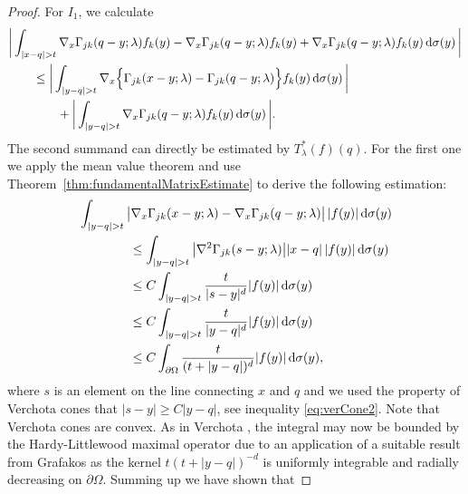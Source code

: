 \begin{proof}
   For $I_1$, we calculate
   \begin{align*}
     &\bigg| \int_{| x - q | > t} \nabla_x \Gamma_{j k} (q - y; \lambda) f_k(y) - \nabla_x \Gamma_{jk}(q - y; \lambda) f_k(y) + \nabla_x \Gamma_{jk}(q - y; \lambda) f_k(y) \, {\operatorname{d}\!{\sigma}}(y) \, \bigg| \\
     &\qquad\leq \bigg| \int_{|y - q| > t} \nabla_x \Big\{ \Gamma_{jk}(x - y; \lambda) -  \Gamma_{jk}(q - y; \lambda)\Big\} f_k(y) \, {\operatorname{d}\!{\sigma}}(y) \, \bigg| \\
     &\qquad\qquad+ \bigg| \int_{|y - q| > t} \nabla_x\Gamma_{jk}(q - y; \lambda) f_k(y) \, {\operatorname{d}\!{\sigma}}(y) \, \bigg|.
   \end{align*}
  The second summand can directly be estimated by $T_\lambda^*(f)(q)$.
  For the first one we apply the mean value theorem and use Theorem~\ref{thm:fundamentalMatrixEstimate} to derive the following estimation:
  \begin{align*}
    &\int_{|y - q| > t} \big| \nabla_x\Gamma_{jk}(x - y; \lambda) - \nabla_x\Gamma_{jk}(q - y; \lambda) \big| \, |f(y)| \, {\operatorname{d}\!{\sigma}}(y) \\ 
    &\qquad\qquad\leq \int_{|y - q| > t} \big|\nabla^2 \Gamma_{jk}(s - y; \lambda)\big| |x - q|\, |f(y) | \, {\operatorname{d}\!{\sigma}}(y) \\
    &\qquad\qquad\leq C  \int_{|y - q| > t} \frac{t}{|s - y|^{d}} |f(y)| \, {\operatorname{d}\!{\sigma}}(y) \\
    &\qquad\qquad\leq C  \int_{|y - q| > t} \frac{t}{|y - q|^{d}} |f(y)| \, {\operatorname{d}\!{\sigma}}(y) \\
    &\qquad\qquad\leq C \int_{\partial\Omega} \frac{t}{(t + |y - q|)^d} |f(y)| \, {\operatorname{d}\!{\sigma}}(y),
  \end{align*}
  where $s$ is an element on the line connecting $x$ and $q$ and we used the property of Verchota cones that $|s - y| \geq C |y - q|$, see inequality \eqref{eq:verCone2}.
  Note that Verchota cones are convex.
  As in Verchota \cite[Lem.\@~1.3]{verchota}, the integral may now be bounded by the Hardy-Littlewood maximal operator due to an application of a suitable result from Grafakos \cite[Thm.\@~2.1.10]{grafakos2014classical} as the kernel ${t}(t + |y - q|)^{-d}$ is uniformly integrable and radially decreasing on $\partial\Omega$.
  Summing up we have shown that

\end{proof}
